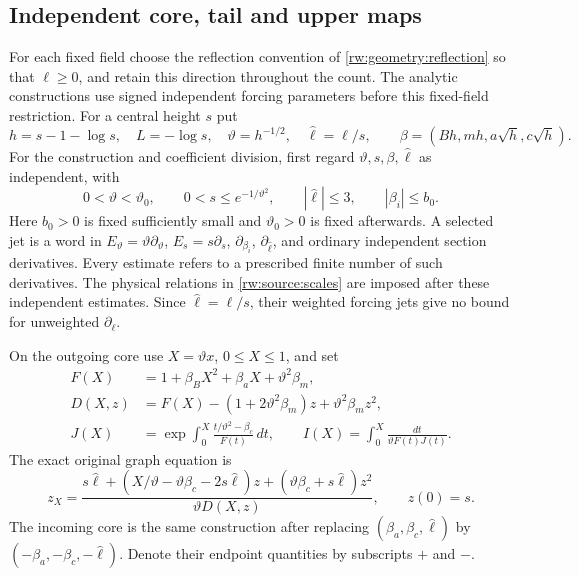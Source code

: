 \subsection{Independent core, tail and upper maps}
\label{rw:source:construction}

For each fixed field choose the reflection convention of
\eqref{rw:geometry:reflection} so that $\ell\ge0$, and retain this
direction throughout the count. The analytic constructions use signed
independent forcing parameters before this fixed-field restriction.
For a central height $s$ put
\begin{equation}\label{rw:source:scales}
 h=s-1-\log s,\quad L=-\log s,\quad
 \vartheta=h^{-1/2},\quad\widehat\ell=\ell/s,\qquad
 \beta=(Bh,mh,a\sqrt h,c\sqrt h).
\end{equation}
For the construction and coefficient division, first regard
$\vartheta,s,\beta,\widehat\ell$ as independent, with
\begin{equation}\label{rw:source:independent-box}
 0<\vartheta<\vartheta_0,\qquad
 0<s\le e^{-1/\vartheta^2},\qquad
 |\widehat\ell|\le3,\qquad |\beta_i|\le b_0.
\end{equation}
Here $b_0>0$ is fixed sufficiently small and $\vartheta_0>0$
is fixed afterwards. A selected jet is a word in
$E_\vartheta=\vartheta\partial_\vartheta$, $E_s=s\partial_s$,
$\partial_{\beta_i}$, $\partial_{\widehat\ell}$, and ordinary independent
section derivatives. Every estimate refers to a prescribed finite
number of such derivatives. The physical relations in
\eqref{rw:source:scales} are imposed after
these independent estimates. Since $\widehat\ell=\ell/s$, their
weighted forcing jets give no bound for unweighted $\partial_\ell$.

On the outgoing core use $X=\vartheta x$, $0\le X\le1$, and set
\begin{equation}\label{rw:source:core-data}
\begin{split}
 F(X)&=1+\beta_BX^2+\beta_aX+\vartheta^2\beta_m,\\
 D(X,z)&=F(X)-(1+2\vartheta^2\beta_m)z+\vartheta^2\beta_mz^2,\\
 J(X)&=\exp\int_0^X\frac{t/\vartheta^2-\beta_c}{F(t)}\,dt,
 \qquad I(X)=\int_0^X\frac{dt}{\vartheta F(t)J(t)}.
\end{split}
\end{equation}
The exact original graph equation is
\begin{equation}\label{rw:source:core-equation}
 z_X=\frac{s\widehat\ell+(X/\vartheta-\vartheta\beta_c-2s\widehat\ell)z
                      +(\vartheta\beta_c+s\widehat\ell)z^2}
                 {\vartheta D(X,z)},\qquad z(0)=s.
\end{equation}
The incoming core is the same construction after replacing
$(\beta_a,\beta_c,\widehat\ell)$ by $(-\beta_a,-\beta_c,-\widehat\ell)$.
Denote their endpoint quantities by subscripts $+$ and $-$.

